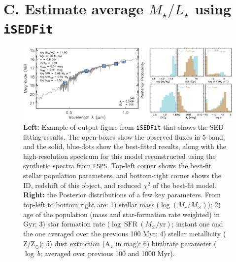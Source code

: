 \documentclass[a4paper,fleqn,usenatbib]{mnras}
\def\logms{{$\log (M_{\star}/M_{\odot})$}}
\begin{document}

\section{C. Estimate average {$M_{\star}/L_{\star}$} using \texttt{iSEDFit}} 
    \label{app:sed} 

    \begin{figure}
        \begin{center}
        \includegraphics[width=\textwidth]{fig/redbcg_isedfit_example.pdf}
        \caption{
            \textbf{Left:} Example of output figure from \texttt{iSEDFit} that shows 
            the SED fitting results. 
            The open-boxes show the observed fluxes in 5-band, and the solid, blue-dots
            show the best-fitted results, along with the high-resolution spectrum for
            this model reconstructed using the synthetic spectra from \texttt{FSPS}. 
            Top-left corner shows the best-fit stellar population parameters, and 
            bottom-right corner shows the ID, redshift of this object, and reduced 
            $\chi^2$ of the best-fit model.~~~
            \textbf{Right:} the Posterior distributions of a few key parameters.
            From top-left to bottom right are: 
            1) stellar mass (\logms{}); 
            2) age of the population (mass and star-formation rate weighted) in Gyr; 
            3) star formation rate ($\log\ \mathrm{SFR}\ (M_{\odot}/\mathrm{yr})$; 
            instant one and the one averaged over the previous 100 Myr; 
            4) stellar metallicity ($\mathrm{Z}/\mathrm{Z}_{\odot}$); 
            5) dust extinction ($\mathrm{A}_V$ in mag);
            6) birthrate parameter ($\log\ b$; averaged over previous 100 and 1000 Myr).
            }
        \label{fig:ised}
        \end{center}
    \end{figure}
\end{document}
